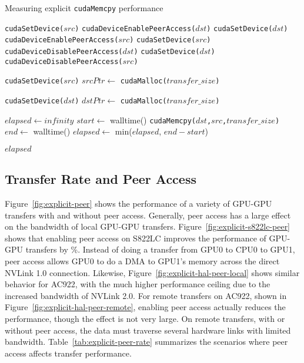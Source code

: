 \begin{algorithm}
    \caption{Measuring explicit \texttt{cudaMemcpy} performance}
    \label{alg:explicit}
    \begin{algorithmic}[1]
    \Statex
            \State \texttt{cudaSetDevice($src$)}
            \State \texttt{cudaDeviceEnablePeerAccess($dst$)}
            \State \texttt{cudaSetDevice($dst$)}
            \State \texttt{cudaDeviceEnablePeerAccess($src$)}
        \Else
            \State \texttt{cudaSetDevice($src$)}
            \State \texttt{cudaDeviceDisablePeerAccess($dst$)}
            \State \texttt{cudaSetDevice($dst$)}
            \State \texttt{cudaDeviceDisablePeerAccess($src$)}        
        \EndIf

        \State \texttt{cudaSetDevice($src$)} 
        \State $srcPtr \gets$ \texttt{cudaMalloc($transfer\_size$)}

        \State \texttt{cudaSetDevice($dst$)} 
        \State $dstPtr \gets$ \texttt{cudaMalloc($transfer\_size$)}

        \State $elapsed \gets infinity$ 
            \State $start \gets$ walltime()
            \State \texttt{cudaMemcpy($dst$,$src$,$transfer\_size$)}
            \State $end \gets$ walltime()
            \State $elapsed \gets$ min($elapsed$, $end-start$)
        \EndFor

    \Return $elapsed$
    \EndFunction

    \end{algorithmic}
\end{algorithm}

\subsection{Transfer Rate and Peer Access}
\label{sec:explicit-peer-bandwidth}

Figure~\ref{fig:explicit-peer} shows the performance of a variety of GPU-GPU transfers with and without peer access.
Generally, peer access has a large effect on the bandwidth of local GPU-GPU transfers.
Figure~\ref{fig:explicit-s822lc-peer} shows that enabling peer access on S822LC improves the performance of GPU-GPU transfers by \%.
Instead of doing a transfer from GPU0 to CPU0 to GPU1, peer access allows GPU0 to do a DMA to GPU1's memory across the direct NVLink 1.0 connection.
Likewise, Figure~\ref{fig:explicit-hal-peer-local} shows similar behavior for AC922, with the much higher performance ceiling due to the increased bandwidth of NVLink 2.0.
For remote transfers on AC922, shown in Figure~\ref{fig:explicit-hal-peer-remote}, enabling peer access actually reduces the performance, though the effect is not very large.
On remote transfers, with or without peer access, the data must traverse several hardware links with limited bandwidth.
Table~\ref{tab:explicit-peer-rate} summarizes the scenarios where peer access affects transfer performance.


